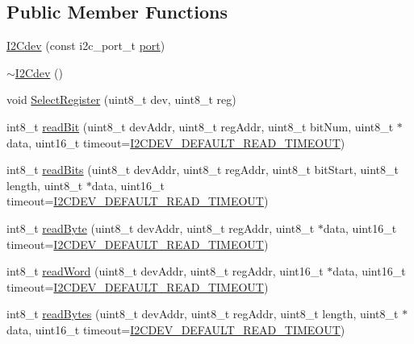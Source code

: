 \subsection*{Public Member Functions}
\begin{DoxyCompactItemize}
\item 
\mbox{\hyperlink{classI2Cdev_afd73def195a0441baf3e4dd774de606f}{I2\+Cdev}} (const i2c\+\_\+port\+\_\+t \mbox{\hyperlink{classI2Cdev_a1d1e63732aa9f50369172b27a034129c}{port}})
\item 
\mbox{\hyperlink{classI2Cdev_af9aa307995256fd1ea40e25c956e76fd}{$\sim$\+I2\+Cdev}} ()
\item 
void \mbox{\hyperlink{classI2Cdev_a3be31bf7d3f40bb215d8854aac945db3}{Select\+Register}} (uint8\+\_\+t dev, uint8\+\_\+t reg)
\item 
int8\+\_\+t \mbox{\hyperlink{classI2Cdev_ab028a4f330f4f31dc8af9890431a2a63}{read\+Bit}} (uint8\+\_\+t dev\+Addr, uint8\+\_\+t reg\+Addr, uint8\+\_\+t bit\+Num, uint8\+\_\+t $\ast$data, uint16\+\_\+t timeout=\mbox{\hyperlink{I2Cdev_8h_ad9726bb02451bb8f59d3d2729e4cd20e}{I2\+C\+D\+E\+V\+\_\+\+D\+E\+F\+A\+U\+L\+T\+\_\+\+R\+E\+A\+D\+\_\+\+T\+I\+M\+E\+O\+UT}})
\item 
int8\+\_\+t \mbox{\hyperlink{classI2Cdev_a362d1d9bf44d01f0dfd7db94df8a61e5}{read\+Bits}} (uint8\+\_\+t dev\+Addr, uint8\+\_\+t reg\+Addr, uint8\+\_\+t bit\+Start, uint8\+\_\+t length, uint8\+\_\+t $\ast$data, uint16\+\_\+t timeout=\mbox{\hyperlink{I2Cdev_8h_ad9726bb02451bb8f59d3d2729e4cd20e}{I2\+C\+D\+E\+V\+\_\+\+D\+E\+F\+A\+U\+L\+T\+\_\+\+R\+E\+A\+D\+\_\+\+T\+I\+M\+E\+O\+UT}})
\item 
int8\+\_\+t \mbox{\hyperlink{classI2Cdev_a80bf7daa6a6c34df95de78ac54d01b1f}{read\+Byte}} (uint8\+\_\+t dev\+Addr, uint8\+\_\+t reg\+Addr, uint8\+\_\+t $\ast$data, uint16\+\_\+t timeout=\mbox{\hyperlink{I2Cdev_8h_ad9726bb02451bb8f59d3d2729e4cd20e}{I2\+C\+D\+E\+V\+\_\+\+D\+E\+F\+A\+U\+L\+T\+\_\+\+R\+E\+A\+D\+\_\+\+T\+I\+M\+E\+O\+UT}})
\item 
int8\+\_\+t \mbox{\hyperlink{classI2Cdev_af62cd3a62562c704c6f183ea7a42064d}{read\+Word}} (uint8\+\_\+t dev\+Addr, uint8\+\_\+t reg\+Addr, uint16\+\_\+t $\ast$data, uint16\+\_\+t timeout=\mbox{\hyperlink{I2Cdev_8h_ad9726bb02451bb8f59d3d2729e4cd20e}{I2\+C\+D\+E\+V\+\_\+\+D\+E\+F\+A\+U\+L\+T\+\_\+\+R\+E\+A\+D\+\_\+\+T\+I\+M\+E\+O\+UT}})
\item 
int8\+\_\+t \mbox{\hyperlink{classI2Cdev_ab1ba3954fcc16341aa6e04e0a569c0ea}{read\+Bytes}} (uint8\+\_\+t dev\+Addr, uint8\+\_\+t reg\+Addr, uint8\+\_\+t length, uint8\+\_\+t $\ast$data, uint16\+\_\+t timeout=\mbox{\hyperlink{I2Cdev_8h_ad9726bb02451bb8f59d3d2729e4cd20e}{I2\+C\+D\+E\+V\+\_\+\+D\+E\+F\+A\+U\+L\+T\+\_\+\+R\+E\+A\+D\+\_\+\+T\+I\+M\+E\+O\+UT}})

\end{DoxyCompactItemize}
